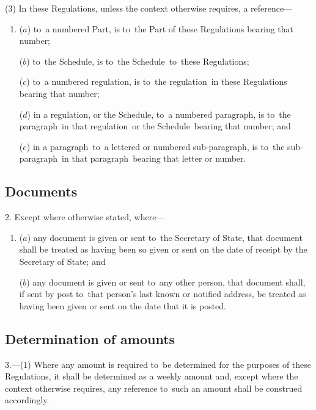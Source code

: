 \documentclass[12pt,a4paper]{article}
\begin{document}
(3) In these Regulations, unless the context otherwise requires, a reference—
\begin{enumerate}\item[]
($a$) to~a numbered Part, is to~the Part of these Regulations bearing that number;

($b$) to~the Schedule, is to~the Schedule~to~these Regulations;

($c$) to~a numbered regulation, is to~the regulation~in these Regulations bearing that number;

($d$) in a regulation, or the Schedule, to~a numbered paragraph, is to~the paragraph~in that regulation~or the Schedule~bearing that number; and

($e$) in a paragraph~to~a lettered or numbered sub-paragraph, is to~the sub-paragraph~in that paragraph~bearing that letter or number.
\end{enumerate}


\subsection[2. Documents]{Documents}

2.  Except where otherwise stated, where—
\begin{enumerate}\item[]
($a$) any document is given or sent to~the Secretary of State, that document shall be treated as having been so given or sent on the date of receipt by the Secretary of State; and

($b$) any document is given or sent to~any other person, that document shall, if sent by post to~that person’s last known or notified address, be treated as having been given or sent on the date that it is posted.
\end{enumerate}

\subsection[3. Determination of amounts]{Determination of amounts}

3.---(1)  Where any amount is required to~be determined for the purposes of these Regulations, it shall be determined as a weekly amount and, except where the context otherwise requires, any reference to~such an amount shall be construed accordingly.
\end{document}
